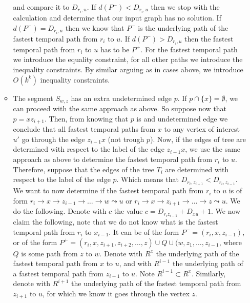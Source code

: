 \documentclass[11pt,a4paper]{article}
\theoremstyle{remark}
\theoremstyle{definition}
\begin{document}
\begin{enumerate}[(i)]
\begin{itemize}
        and compare it to $D_{r_i,u}$.
        If $d(P^{-}) < D_{r_i,u} $ then we stop with the calculation and determine that our input graph has no solution.
        If $d(P^{-}) = D_{r_i,u} $ then we know that $P^{-}$ is the underlying path of the fastest temporal path from $r_i$ to $u$. 
        If $d(P^{-}) > D_{r_i,u} $ then the fastest temporal path from $r_i$ to $u$ has to be $P^{+}$.
        For the fastest temporal path we introduce the equality constraint, 
        for all other paths we introduce the inequality constraints.
        By similar arguing as in cases above, we introduce $O(k^k)$ inequality constraints.
        \item The segment $S_{w,z}$ has an extra undetermined edge $p$. If $p \cap \{x\} = \emptyset$, 
        we can proceed with the same approach as above.
        So suppose now that $p = x z_{i+1}$. 
        Then, from knowing that $p$ is and undetermined edge we conclude that
        all fastest temporal paths from $x$ to any vertex of interest $u'$ go through the edge $z_{i-1}x$ (not trough $p$).
        Now, if the edges of tree are determined with respect to the label of the edge $z_{i-1}x$,
        we use the same approach as above to determine the fastest temporal path from $r_i$ to $u$.
        Therefore, suppose that the edges of the tree $T_i$ are determined with respect to the label of the edge $p$.
        Which means that $D_{r_i, z_{i+1}} < D_{r_i, z_{i-1}}$.
        We want to now determine if the fastest temporal path from $r_i$ to $u$ is of form 
        $r_i \rightarrow x \rightarrow z_{i-1} \rightarrow \dots \rightarrow w \leadsto u$ or
        $r_i \rightarrow x \rightarrow z_{i+1} \rightarrow \dots \rightarrow z \leadsto u$.
        We do the following.
        Denote with $c$ the value $c = D_{r_i z_{i-1}} + D_{x u} + 1$.
        We now claim the following, note that we do not know what is the fastest temporal path from $r_i$ to $x_{i-1}$. 
        It can be of the form $P^- = (r_i,x,z_{i-1})$,
        or of the form $P^+ = (r_i,x, z_{i+1}, z_{i+2}, \dots, z) \cup Q \cup (w, z_1, \dots, z_{i-1}$, where $Q$ is some path from $z$ to $w$.
        Denote with $R^x$ the underlying path of the fastest temporal path from $x$ to $u$,
        and with $R^{i-1}$ the underlying path of a fastest temporal path from $z_{i-1}$ to $u$.
        Note $R^{i-1} \subset R^x$.
        Similarly,
        denote with $R^{i+1}$ the underlying path of the fastest temporal path from $z_{i+1}$ to $u$, 
        for which we know it goes through the vertex $z$.
        \begin{itemize}

\end{itemize}
\end{itemize}
\end{enumerate}
\end{document}
